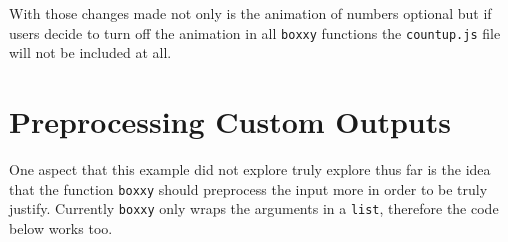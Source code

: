 \documentclass[
]{krantz}
\makeatletter
\newenvironment{Shaded}{\begin{snugshade}}{\end{snugshade}}
\newcommand{\ControlFlowTok}[1]{\textcolor[rgb]{0.27,0.27,0.27}{\textbf{#1}}}
\newcommand{\DataTypeTok}[1]{\textcolor[rgb]{0.27,0.27,0.27}{#1}}
\newcommand{\DecValTok}[1]{\textcolor[rgb]{0.06,0.06,0.06}{#1}}
\newcommand{\KeywordTok}[1]{\textcolor[rgb]{0.27,0.27,0.27}{\textbf{#1}}}
\newcommand{\NormalTok}[1]{#1}
\newcommand{\OperatorTok}[1]{\textcolor[rgb]{0.43,0.43,0.43}{\textbf{#1}}}
\newcommand{\OtherTok}[1]{\textcolor[rgb]{0.37,0.37,0.37}{#1}}
\newcommand{\StringTok}[1]{\textcolor[rgb]{0.5,0.5,0.5}{#1}}
\newenvironment{kframe}{%
\medskip{}
\setlength{\fboxsep}{.8em}
 \def\at@end@of@kframe{}%
 \ifinner\ifhmode%
  \def\at@end@of@kframe{\end{minipage}}%
  \begin{minipage}{\columnwidth}%
 \fi\fi%
 \def\FrameCommand##1{\hskip\@totalleftmargin \hskip-\fboxsep
 \colorbox{shadecolor}{##1}\hskip-\fboxsep
     \hskip-\linewidth \hskip-\@totalleftmargin \hskip\columnwidth}%
 \MakeFramed {\advance\hsize-\width
   \@totalleftmargin\z@ \linewidth\hsize
   \@setminipage}}%
 {\par\unskip\endMakeFramed%
 \at@end@of@kframe}
\renewenvironment{Shaded}{\begin{kframe}}{\end{kframe}}
\makeatother
\begin{document}
With those changes made not only is the animation of numbers optional but if users decide to turn off the animation in all \texttt{boxxy} functions the \texttt{countup.js} file will not be included at all.

\begin{Shaded}
\end{Shaded}

\hypertarget{shiny-output-preprocess}{%
\section{Preprocessing Custom Outputs}\label{shiny-output-preprocess}}

One aspect that this example did not explore truly explore thus far is the idea that the function \texttt{boxxy} should preprocess the input more in order to be truly justify. Currently \texttt{boxxy} only wraps the arguments in a \texttt{list}, therefore the code below works too.
\end{document}
